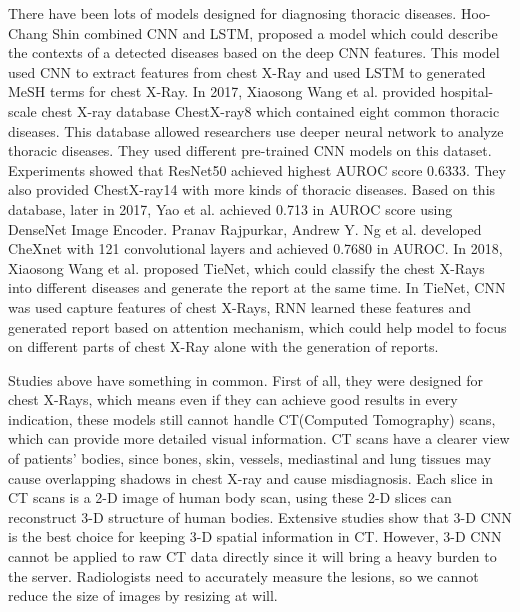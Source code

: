 \documentclass[journal]{IEEEtran}
\begin{document}
There have been lots of models designed for diagnosing thoracic diseases.
Hoo-Chang Shin \cite{Shin2016Learning} combined CNN and LSTM\cite{hochreiter1997long}, proposed a model which could describe the contexts of a detected diseases based on the deep CNN features. This model used CNN to extract features from chest X-Ray and used LSTM to generated MeSH\cite{timmurphy.org} terms for chest X-Ray. In 2017, Xiaosong Wang et al.\cite{Wang2017ChestX} provided hospital-scale chest X-ray database ChestX-ray8 which contained eight common thoracic diseases. This database allowed researchers use deeper neural network to analyze thoracic diseases. They used different pre-trained CNN models on this dataset. Experiments showed that ResNet50 achieved highest AUROC score 0.6333. They also provided ChestX-ray14 with more kinds of thoracic diseases.
Based on this database, later in 2017, Yao et al.\cite{yao2017learning} achieved 0.713 in AUROC score using DenseNet Image Encoder. Pranav Rajpurkar, Andrew Y. Ng et al. \cite{Rajpurkar2017CheXNet} developed CheXnet with 121 convolutional layers and achieved 0.7680 in AUROC.
In 2018, Xiaosong Wang et al.\cite{Wang2018TieNet} proposed TieNet, which could classify the chest X-Rays into different diseases and generate the report at the same time. In TieNet, CNN was used capture features of chest X-Rays, RNN learned these features and generated report based on attention mechanism, which could help model to focus on different parts of chest X-Ray alone with the generation of reports. 

Studies above have something in common. First of all, they were designed for chest X-Rays, which means even if they can achieve good results in every indication, these models still cannot handle CT(Computed Tomography) scans, which can provide more detailed visual information. CT scans have a clearer view of patients' bodies, since bones, skin, vessels, mediastinal and lung tissues may cause overlapping shadows in chest X-ray and cause misdiagnosis.
Each slice in CT scans is a 2-D image of human body scan, using these 2-D slices can reconstruct 3-D structure of human bodies. 
Extensive studies show that 3-D CNN is the best choice for keeping 3-D spatial information in CT\cite{Yorozu1987Electron}. However, 3-D CNN cannot be applied to raw CT data directly since it will bring a heavy burden to the server. Radiologists need to accurately measure the lesions, so we cannot reduce the size of images by resizing at will.
 
\end{document}
